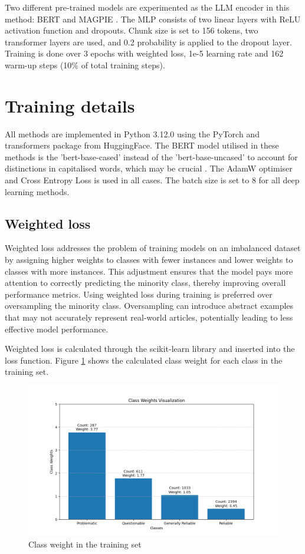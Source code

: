 Two different pre-trained models are experimented as the LLM encoder in this method: BERT \cite{devlin-2019-bert} and MAGPIE \cite{horych-2024-magpie}. The MLP consists of two linear layers with ReLU activation function \cite{agarap-2018-relu} and dropouts. Chunk size is set to 156 tokens, two transformer layers are used, and 0.2 probability is applied to the dropout layer. Training is done over 3 epochs with weighted loss, 1e-5 learning rate and 162 warm-up steps (10\% of total training steps).

\section{Training details}

All methods are implemented in Python 3.12.0 \cite{van-1995-python} using the PyTorch \cite{paszke-2017-pytorch} and transformers \cite{wolf-2020-huggingface} package from HuggingFace. The BERT model utilised in these methods is the 'bert-base-cased' instead of the 'bert-base-uncased' to account for distinctions in capitalised words, which may be crucial \cite{devlin-2019-bert}. The AdamW \cite{loshchilov-2019-adamw} optimiser and Cross Entropy Loss is used in all cases. The batch size is set to 8 for all deep learning methods.

\subsection{Weighted loss}

Weighted loss addresses the problem of training models on an imbalanced dataset by assigning higher weights to classes with fewer instances and lower weights to classes with more instances. This adjustment ensures that the model pays more attention to correctly predicting the minority class, thereby improving overall performance metrics. Using weighted loss during training is preferred over oversampling the minority class. Oversampling can introduce abstract examples that may not accurately represent real-world articles, potentially leading to less effective model performance.

Weighted loss is calculated through the scikit-learn library \cite{pedregosa-2011-scikit-learn} and inserted into the loss function. Figure \ref{fig:class_weight} shows the calculated class weight for each class in the training set.


\begin{figure}[htbp]
    \centering
    \includegraphics[width=0.9\linewidth]{figures/class_weight.png}
    \caption{Class weight in the training set}
    \label{fig:class_weight}
\end{figure}



